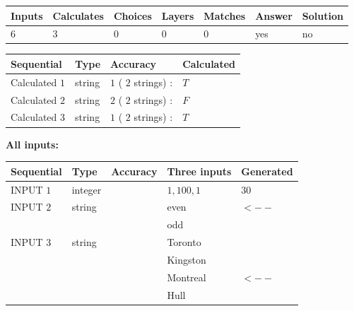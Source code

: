 \documentclass[12pt]{article}
\begin{document}
   
\noindent\begin{tabular}{|l|l|l|l|l|l|l|}
 \hline
Inputs & Calculates & Choices & Layers & Matches & Answer & Solution \\ \hline
           6 & 
           3 & 
           0
  & 
           0 & 
           0 & 
  yes & 
  no 
  \\ \hline
 \end{tabular}
   
   
   
   
\noindent{}
   
   
  
  
\noindent\begin{tabular}{|l|l|l|l|}
\hline
 Sequential & Type & Accuracy & Calculated \\ 
\hline
 
 
  Calculated $           1$ & string & $           1 $ ( $          2 $ strings)
 : 
 & $T$
 \\  \hline  
 
 
  Calculated $           2$ & string & $           2 $ ( $          2 $ strings)
 : 
 & $F$
 \\  \hline  
 
 
  Calculated $           3$ & string & $           1 $ ( $          2 $ strings)
 : 
 & $T$
 \\  \hline  
 \end{tabular}
   
   
   
   
\noindent\vspace{0.1in}\hspace{-0.08in} {\textbf{\Large{All inputs: }}}
   
   
  
  
\noindent\begin{tabular}{|l|l|l|l|l|}
\hline
 Sequential & Type & Accuracy & Three inputs & Generated \\ 
\hline
 
 
  INPUT $           1$ & integer &  & $
 1
 , 
 100
 , 
 1
 $ & $ 30 $ 
 \\  \hline  
 
 
  INPUT $           2$ & string & & 
 even & 
  $ <-- $ 
  \\
  & & & 
 odd & 
 \\  \hline  
 
 
  INPUT $           3$ & string & & 
 Toronto & 
  \\
  & & & 
 Kingston & 
  \\
  & & & 
 Montreal & 
  $ <-- $ 
  \\
  & & & 
 Hull & 
 \\  \hline  
 \end{tabular}
   
\end{document}
